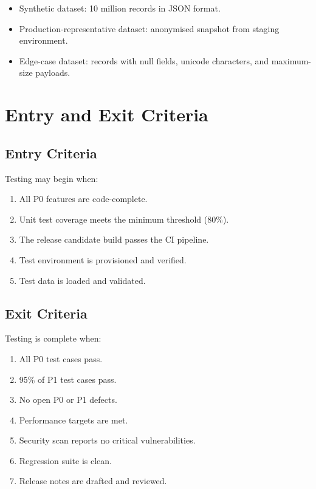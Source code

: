 \documentclass[
    language=english,
    doctype=technical-report,
    institution=none,
    titlestyle=book,
    oneside,
]{../../omnilatex}
\begin{document}
\begin{itemize}
    \item Synthetic dataset: 10 million records in JSON format.
    \item Production-representative dataset: anonymised snapshot from
        staging environment.
    \item Edge-case dataset: records with null fields, unicode characters,
        and maximum-size payloads.
\end{itemize}

\chapter{Entry and Exit Criteria}
\label{sec:criteria}

\section{Entry Criteria}

Testing may begin when:

\begin{enumerate}
    \item All P0 features are code-complete.
    \item Unit test coverage meets the minimum threshold (80\%).
    \item The release candidate build passes the CI pipeline.
    \item Test environment is provisioned and verified.
    \item Test data is loaded and validated.
\end{enumerate}

\section{Exit Criteria}

Testing is complete when:

\begin{enumerate}
    \item All P0 test cases pass.
    \item 95\% of P1 test cases pass.
    \item No open P0 or P1 defects.
    \item Performance targets are met.
    \item Security scan reports no critical vulnerabilities.
    \item Regression suite is clean.
    \item Release notes are drafted and reviewed.
\end{enumerate}
\end{document}
